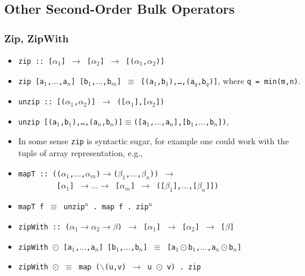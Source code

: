 \documentclass{beamer}
\renewcommand{\emph}[1]{\textcolor{structure}{#1}}
\newcommand{\emp}[1]{\textcolor{DikuRed}{ #1}}
\begin{document}
\subsection{Other Second-Order Bulk Operators}

\begin{frame}[fragile,t]
  \frametitle{Zip, ZipWith}

\begin{itemize}
    \item \emph{\tt zip :: [$\alpha_1$] $\rightarrow$ [$\alpha_2$] $\rightarrow$ [($\alpha_1$,$\alpha_2$)]}
    \item \emp{\tt zip [a$_1$,$\ldots$,a$_n$] [b$_1$,$\ldots$,b$_m$] $\equiv$ [(a$_1$,b$_1$),\ldots,(a$_q$,b$_q$)]},
            where {\tt q = min(m,n)}.\pause
    \item \emph{\tt unzip :: [($\alpha_1$,$\alpha_2$)] $\rightarrow$ ([$\alpha_1$],[$\alpha_2$])}
    \item \emp{\tt unzip [(a$_1$,b$_1$),\ldots,(a$_n$,b$_n$)]$\equiv$([a$_1$,$\ldots$,a$_n$],[b$_1$,$\ldots$,b$_n$])},\pause\medskip

    \item In some sense {\tt zip} is syntactic sugar, for example one could work with the
            tuple of array representation, e.g.,
    \item \emp{\tt mapT :: (($\alpha_1$,$\ldots$,$\alpha_m$)$\rightarrow$($\beta_1$,$\ldots$,$\beta_n$)) $\rightarrow$}\\ 
          \emp{\tt~~~~~~~~~[$\alpha_1$] $\rightarrow\ldots\rightarrow$ [$\alpha_m$] $\rightarrow$ ([$\beta_1$],$\ldots$,[$\beta_n$]])}
    \item \emph{\tt mapT f $\equiv$ unzip$^n$ . map f . zip$^n$}\pause\medskip

    \item {\tt zipWith :: ($\alpha_1\rightarrow\alpha_2\rightarrow\beta$) $\rightarrow$ [$\alpha_1$] $\rightarrow$ [$\alpha_2$] $\rightarrow$ [$\beta$]}
    \item {\tt zipWith $\odot$ [a$_1$,$\ldots$,a$_n$] [b$_1$,$\ldots$,b$_n$] $\equiv$ [a$_1\odot$b$_1$,$\ldots$,a$_n\odot$b$_n$]}
    \item {\tt zipWith $\odot$ $\equiv$ map ($\backslash$(u,v) $\rightarrow$ u $\odot$ v) . zip}
\end  {itemize}

\end{frame}
\end{document}
